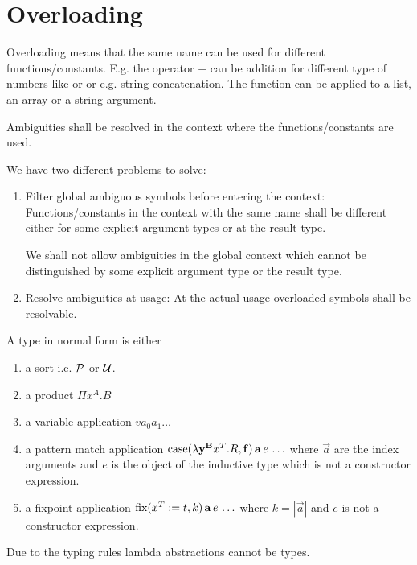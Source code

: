 \vskip 5mm
\section{Overloading}

Overloading means that the same name can be used for different
functions/constants. E.g. the operator $+$ can be addition for different type of
numbers like  or  or e.g. string concatenation. The
function  can be applied to a list, an array or a string argument.

Ambiguities shall be resolved in the context where the functions/constants are
used.

We have two different problems to solve:
\begin{enumerate}

\item Filter global ambiguous symbols before entering the context:
Functions/constants in the context with the same name shall be different either
for some explicit argument types or at the result type.

We shall not allow ambiguities in the global context which cannot be
distinguished by some explicit argument type or the result type.


\item Resolve ambiguities at usage: At the actual usage overloaded symbols shall
be resolvable.

\end{enumerate}

A type in normal form is either
\begin{enumerate}

\item a sort i.e. ${\cal{P}}$ or ${\cal{U}}$.

\item a product $\Pi x^A. B$

\item a variable application $v a_0 a_1 \ldots$

\item a pattern match application
    $\text{case}(\lambda \mathbf{y}^{\mathbf{B}} x^T. R, \mathbf{f}) \,\mathbf{a}\, e\, \ldots$
    where $\vec{a}$ are the index arguments and $e$ is the object of the
    inductive type which is not a constructor expression.

\item a fixpoint application
    $\text{fix}(x^T := t, k)\, \mathbf{a}\, e\, \ldots$
    where $k = |\vec{a}|$ and $e$ is not a constructor expression.
\end{enumerate}
%
Due to the typing rules lambda abstractions cannot be types.





